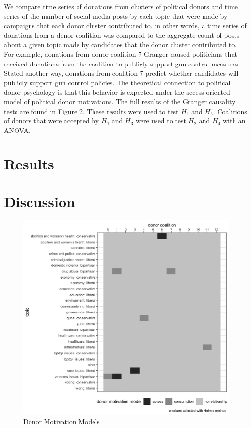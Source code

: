 \documentclass[12pt,]{article}
\begin{document}
We compare time series of donations from clusters of political donors
and time series of the number of social media posts by each topic that
were made by campaigns that each donor cluster contributed to. in other
words, a time series of donations from a donor coalition was compared to
the aggregate count of posts about a given topic made by candidates that
the donor cluster contributed to. For example, donations from donor
coalition 7 Granger caused politicians that received donations from the
coalition to publicly support gun control measures. Stated another way,
donations from coalition 7 predict whether candidates will publicly
support gun control policies. The theoretical connection to political
donor psychology is that this behavior is expected under the
access-oriented model of political donor motivations. The full results
of the Granger causality tests are found in Figure 2. These results were
used to test \(H_{1}\) and \(H_{3}\). Coalitions of donors that were
accepted by \(H_{1}\) and \(H_{3}\) were used to test \(H_{2}\) and
\(H_{4}\) with an ANOVA.

\hypertarget{results}{%
\section{Results}\label{results}}

\hypertarget{discussion}{%
\section{Discussion}\label{discussion}}

\begin{figure}
\centering
\includegraphics{../tables_and_figures/aejmc_abstract_1.jpg}
\caption{Donor Motivation Models}
\end{figure}
\end{document}
